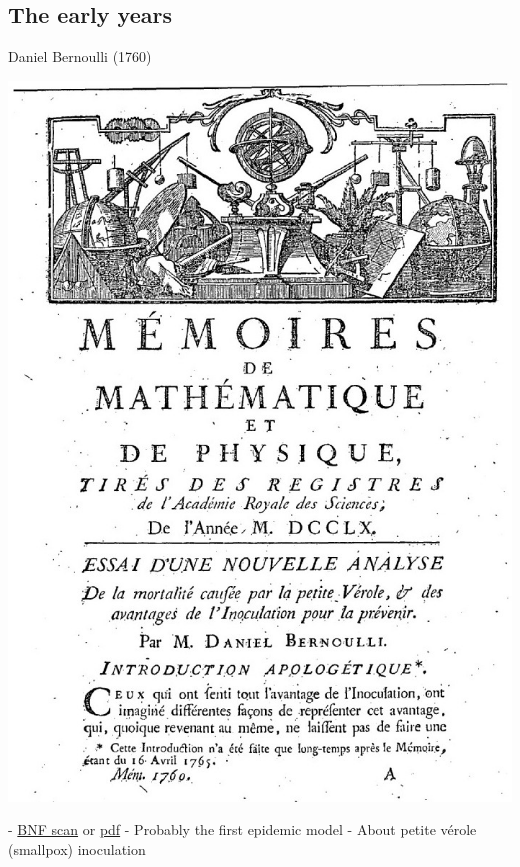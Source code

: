 \documentclass[aspectratio=43]{beamer}
\begin{document}
\subsection{The early years}
\begin{frame}{Daniel Bernoulli (1760)}
\begin{minipage}{0.5\textwidth}
    \includegraphics[width=\textwidth]{../FIGS/Bernoulli-1760-first_page.jpg}
\end{minipage}
\begin{minipage}{0.47\textwidth}
- \href{https://gallica.bnf.fr/ark:/12148/bpt6k3558n/f220.item}{BNF scan} or \href{https://julien-arino.github.io/assets/pdf/Bernoulli-1760.pdf}{pdf}
\vfill
- Probably the first epidemic model
\vfill
- About petite vérole (smallpox) inoculation    
\end{minipage}
\end{frame}
\end{document}
